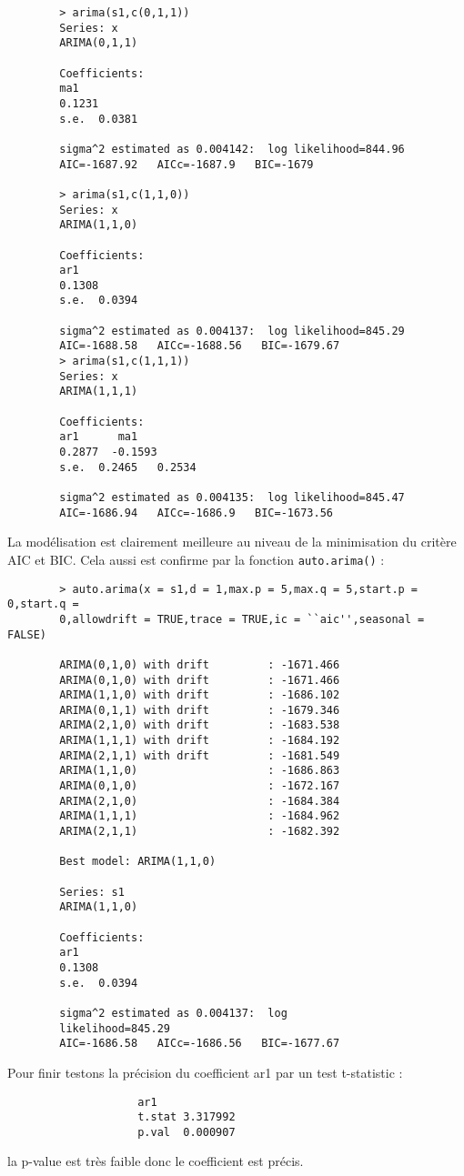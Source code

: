         \begin{verbatim}
        > arima(s1,c(0,1,1))
        Series: x 
        ARIMA(0,1,1)                    

        Coefficients:
        ma1
        0.1231
        s.e.  0.0381

        sigma^2 estimated as 0.004142:  log likelihood=844.96
        AIC=-1687.92   AICc=-1687.9   BIC=-1679

        > arima(s1,c(1,1,0))
        Series: x 
        ARIMA(1,1,0)                    

        Coefficients:
        ar1
        0.1308
        s.e.  0.0394

        sigma^2 estimated as 0.004137:  log likelihood=845.29
        AIC=-1688.58   AICc=-1688.56   BIC=-1679.67
        > arima(s1,c(1,1,1))
        Series: x 
        ARIMA(1,1,1)                    

        Coefficients:
        ar1      ma1
        0.2877  -0.1593
        s.e.  0.2465   0.2534

        sigma^2 estimated as 0.004135:  log likelihood=845.47
        AIC=-1686.94   AICc=-1686.9   BIC=-1673.56
        \end{verbatim}

        La modélisation est clairement meilleure au niveau de la minimisation du
        critère AIC et BIC. Cela aussi est confirme par la fonction
        \verb+auto.arima()+ :
        \begin{verbatim}
        > auto.arima(x = s1,d = 1,max.p = 5,max.q = 5,start.p = 0,start.q =
        0,allowdrift = TRUE,trace = TRUE,ic = ``aic'',seasonal = FALSE)

        ARIMA(0,1,0) with drift         : -1671.466
        ARIMA(0,1,0) with drift         : -1671.466
        ARIMA(1,1,0) with drift         : -1686.102
        ARIMA(0,1,1) with drift         : -1679.346
        ARIMA(2,1,0) with drift         : -1683.538
        ARIMA(1,1,1) with drift         : -1684.192
        ARIMA(2,1,1) with drift         : -1681.549
        ARIMA(1,1,0)                    : -1686.863
        ARIMA(0,1,0)                    : -1672.167
        ARIMA(2,1,0)                    : -1684.384
        ARIMA(1,1,1)                    : -1684.962
        ARIMA(2,1,1)                    : -1682.392

        Best model: ARIMA(1,1,0)                    

        Series: s1 
        ARIMA(1,1,0)                    

        Coefficients:
        ar1
        0.1308
        s.e.  0.0394

        sigma^2 estimated as 0.004137:  log
        likelihood=845.29
        AIC=-1686.58   AICc=-1686.56   BIC=-1677.67
        \end{verbatim}
        Pour finir testons la précision du coefficient ar1 par un test
        t-statistic :
        \begin{verbatim}
                    ar1
                    t.stat 3.317992
                    p.val  0.000907
        \end{verbatim}
        la p-value est très faible donc le coefficient est précis.
